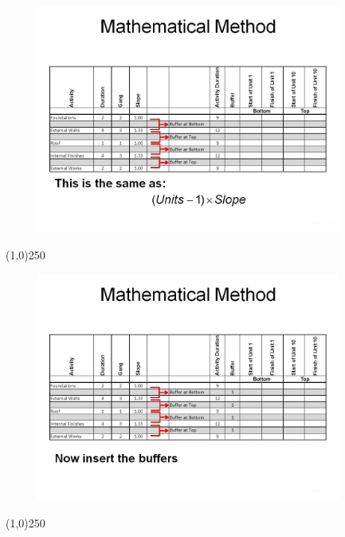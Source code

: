 \begin{frame}
\begin{figure}
	\centering
		\includegraphics[width = 10.0cm]{oldnotes/Slide280.jpg}
\end{figure}
\end{frame}
\begin{center}\line(1,0){250}\end{center}






\begin{frame}
\begin{figure}
	\centering
		\includegraphics[width = 10.0cm]{oldnotes/Slide281.jpg}
\end{figure}
\end{frame}
\begin{center}\line(1,0){250}\end{center}






